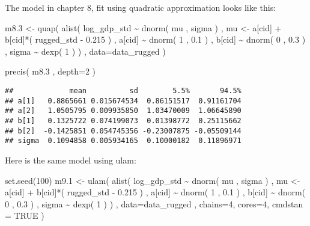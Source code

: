\documentclass[
]{book}
\newenvironment{Shaded}{\begin{snugshade}}{\end{snugshade}}
\newcommand{\AttributeTok}[1]{\textcolor[rgb]{0.77,0.63,0.00}{#1}}
\newcommand{\ConstantTok}[1]{\textcolor[rgb]{0.00,0.00,0.00}{#1}}
\newcommand{\DecValTok}[1]{\textcolor[rgb]{0.00,0.00,0.81}{#1}}
\newcommand{\FloatTok}[1]{\textcolor[rgb]{0.00,0.00,0.81}{#1}}
\newcommand{\FunctionTok}[1]{\textcolor[rgb]{0.00,0.00,0.00}{#1}}
\newcommand{\NormalTok}[1]{#1}
\newcommand{\OtherTok}[1]{\textcolor[rgb]{0.56,0.35,0.01}{#1}}
\newcommand{\SpecialCharTok}[1]{\textcolor[rgb]{0.00,0.00,0.00}{#1}}
\begin{document}
The model in chapter 8, fit using quadratic approximation looks like this:

\begin{Shaded}
\begin{Highlighting}[]
\NormalTok{m8}\FloatTok{.3} \OtherTok{\textless{}{-}} \FunctionTok{quap}\NormalTok{( }\FunctionTok{alist}\NormalTok{(}
\NormalTok{log\_gdp\_std }\SpecialCharTok{\textasciitilde{}} \FunctionTok{dnorm}\NormalTok{( mu , sigma ) , }
\NormalTok{mu }\OtherTok{\textless{}{-}}\NormalTok{ a[cid] }\SpecialCharTok{+}\NormalTok{ b[cid]}\SpecialCharTok{*}\NormalTok{( rugged\_std }\SpecialCharTok{{-}} \FloatTok{0.215}\NormalTok{ ) , }
\NormalTok{a[cid] }\SpecialCharTok{\textasciitilde{}} \FunctionTok{dnorm}\NormalTok{( }\DecValTok{1}\NormalTok{ , }\FloatTok{0.1}\NormalTok{ ) , }
\NormalTok{b[cid] }\SpecialCharTok{\textasciitilde{}} \FunctionTok{dnorm}\NormalTok{( }\DecValTok{0}\NormalTok{ , }\FloatTok{0.3}\NormalTok{ ) , }
\NormalTok{sigma }\SpecialCharTok{\textasciitilde{}} \FunctionTok{dexp}\NormalTok{( }\DecValTok{1}\NormalTok{ )}
\NormalTok{) , }\AttributeTok{data=}\NormalTok{data\_rugged )}

\FunctionTok{precis}\NormalTok{( m8}\FloatTok{.3}\NormalTok{ , }\AttributeTok{depth=}\DecValTok{2}\NormalTok{ )}
\end{Highlighting}
\end{Shaded}

\begin{verbatim}
##             mean          sd        5.5%       94.5%
## a[1]   0.8865661 0.015674534  0.86151517  0.91161704
## a[2]   1.0505795 0.009935850  1.03470009  1.06645890
## b[1]   0.1325722 0.074199073  0.01398772  0.25115662
## b[2]  -0.1425851 0.054745356 -0.23007875 -0.05509144
## sigma  0.1094858 0.005934165  0.10000182  0.11896971
\end{verbatim}

Here is the same model using ulam:

\begin{Shaded}
\begin{Highlighting}[]
\FunctionTok{set.seed}\NormalTok{(}\DecValTok{100}\NormalTok{)}
\NormalTok{m9}\FloatTok{.1} \OtherTok{\textless{}{-}} \FunctionTok{ulam}\NormalTok{( }\FunctionTok{alist}\NormalTok{(}
\NormalTok{log\_gdp\_std }\SpecialCharTok{\textasciitilde{}} \FunctionTok{dnorm}\NormalTok{( mu , sigma ) ,}
\NormalTok{mu }\OtherTok{\textless{}{-}}\NormalTok{ a[cid] }\SpecialCharTok{+}\NormalTok{ b[cid]}\SpecialCharTok{*}\NormalTok{( rugged\_std }\SpecialCharTok{{-}} \FloatTok{0.215}\NormalTok{ ) ,}
\NormalTok{a[cid] }\SpecialCharTok{\textasciitilde{}} \FunctionTok{dnorm}\NormalTok{( }\DecValTok{1}\NormalTok{ , }\FloatTok{0.1}\NormalTok{ ) ,}
\NormalTok{b[cid] }\SpecialCharTok{\textasciitilde{}} \FunctionTok{dnorm}\NormalTok{( }\DecValTok{0}\NormalTok{ , }\FloatTok{0.3}\NormalTok{ ) ,}
\NormalTok{sigma }\SpecialCharTok{\textasciitilde{}} \FunctionTok{dexp}\NormalTok{( }\DecValTok{1}\NormalTok{ )}
\NormalTok{) , }\AttributeTok{data=}\NormalTok{data\_rugged , }\AttributeTok{chains=}\DecValTok{4}\NormalTok{, }\AttributeTok{cores=}\DecValTok{4}\NormalTok{, }\AttributeTok{cmdstan =} \ConstantTok{TRUE}\NormalTok{ )}
\end{Highlighting}
\end{Shaded}
\end{document}
